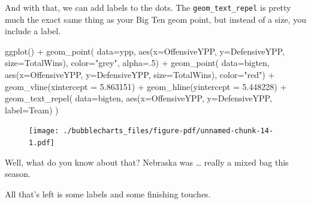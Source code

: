 \documentclass[
  letterpaper,
  DIV=11,
  numbers=noendperiod]{scrreprt}
\newenvironment{Shaded}{\begin{snugshade}}{\end{snugshade}}
\newcommand{\AttributeTok}[1]{\textcolor[rgb]{0.40,0.45,0.13}{#1}}
\newcommand{\DecValTok}[1]{\textcolor[rgb]{0.68,0.00,0.00}{#1}}
\newcommand{\FloatTok}[1]{\textcolor[rgb]{0.68,0.00,0.00}{#1}}
\newcommand{\FunctionTok}[1]{\textcolor[rgb]{0.28,0.35,0.67}{#1}}
\newcommand{\NormalTok}[1]{\textcolor[rgb]{0.00,0.23,0.31}{#1}}
\newcommand{\SpecialCharTok}[1]{\textcolor[rgb]{0.37,0.37,0.37}{#1}}
\newcommand{\StringTok}[1]{\textcolor[rgb]{0.13,0.47,0.30}{#1}}
\begin{document}
And with that, we can add labels to the dots. The
\texttt{geom\_text\_repel} is pretty much the exact same thing as your
Big Ten geom point, but instead of a size, you include a label.

\begin{Shaded}
\begin{Highlighting}[]
\FunctionTok{ggplot}\NormalTok{() }\SpecialCharTok{+} 
  \FunctionTok{geom\_point}\NormalTok{(}
    \AttributeTok{data=}\NormalTok{ypp, }
    \FunctionTok{aes}\NormalTok{(}\AttributeTok{x=}\NormalTok{OffensiveYPP, }\AttributeTok{y=}\NormalTok{DefensiveYPP, }\AttributeTok{size=}\NormalTok{TotalWins), }
    \AttributeTok{color=}\StringTok{"grey"}\NormalTok{, }
    \AttributeTok{alpha=}\NormalTok{.}\DecValTok{5}\NormalTok{) }\SpecialCharTok{+} 
  \FunctionTok{geom\_point}\NormalTok{(}
    \AttributeTok{data=}\NormalTok{bigten, }
    \FunctionTok{aes}\NormalTok{(}\AttributeTok{x=}\NormalTok{OffensiveYPP, }\AttributeTok{y=}\NormalTok{DefensiveYPP, }\AttributeTok{size=}\NormalTok{TotalWins), }
    \AttributeTok{color=}\StringTok{"red"}\NormalTok{) }\SpecialCharTok{+} 
  \FunctionTok{geom\_vline}\NormalTok{(}\AttributeTok{xintercept =} \FloatTok{5.863151}\NormalTok{) }\SpecialCharTok{+} 
  \FunctionTok{geom\_hline}\NormalTok{(}\AttributeTok{yintercept =} \FloatTok{5.448228}\NormalTok{) }\SpecialCharTok{+}
  \FunctionTok{geom\_text\_repel}\NormalTok{(}
    \AttributeTok{data=}\NormalTok{bigten, }
    \FunctionTok{aes}\NormalTok{(}\AttributeTok{x=}\NormalTok{OffensiveYPP, }\AttributeTok{y=}\NormalTok{DefensiveYPP, }\AttributeTok{label=}\NormalTok{Team)}
\NormalTok{  )}
\end{Highlighting}
\end{Shaded}

\begin{figure}[H]

{\centering \texttt{[image: ./bubblecharts\_files/figure-pdf/unnamed-chunk-14-1.pdf]}

}

\end{figure}

Well, what do you know about that? Nebraska was \ldots{} really a mixed
bag this season.

All that's left is some labels and some finishing touches.
\end{document}
